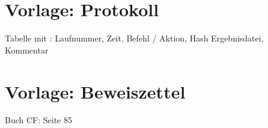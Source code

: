 
%



\chapter{Vorlage: Protokoll}


Tabelle mit : Laufnummer, Zeit, Befehl / Aktion, Hash Ergebnisdatei, Kommentar


\chapter{Vorlage: Beweiszettel}
Buch CF: Seite 85